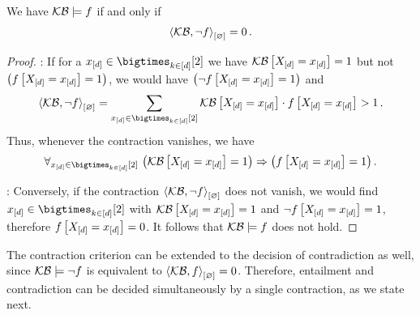 \begin{theorem}
    \label{the:contCriterionLogEntailment}
    We have $\mathcal{KB}\models f$ if and only if
    \begin{align*}
        \left\langle \mathcal{KB},\lnot f\right\rangle_{\left[ \varnothing \right]} = 0 \, .
    \end{align*}
\end{theorem}
\begin{proof}
    \proofleftsymbol:
    If for a $\shortatomindicesin$ we have $\mathcal{KB}\left[X_{[d]}=x_{[d]}\right]=1$ but not $\big(f\left[X_{[d]}=x_{[d]}\right]=1\big)$, we would have $\big(\lnot f\left[X_{[d]}=x_{[d]}\right]=1\big)$ and
    \begin{align*}
        \contraction{\kb,\lnot\exformula} =
        \sum_{\shortatomindicesin} \kbat{\indexedshortcatvariables} \cdot \exformulaat{\indexedshortcatvariables} > 1 \, .
    \end{align*}
    Thus, whenever the contraction vanishes, we have
    \begin{align*}
        \uniquantwrtof{\shortatomindicesin}{\imppremhead{\kbat{\indexedshortcatvariables}=1}{\formulaat{\indexedshortcatvariables}=1}} \, .
    \end{align*}

    \proofrightsymbol:
    Conversely, if the contraction $\left\langle \mathcal{KB},\lnot f\right\rangle_{\left[ \varnothing \right]}$ does not vanish, we would find $\shortatomindicesin$ with $\mathcal{KB}\left[X_{[d]}=x_{[d]}\right]=1$ and $\lnot f\left[X_{[d]}=x_{[d]}\right]=1$, therefore $f\left[X_{[d]}=x_{[d]}\right]=0$.
    It follows that $\mathcal{KB}\models f$ does not hold.
\end{proof}


The contraction criterion can be extended to the decision of contradiction as well, since $\mathcal{KB}\models\lnot f$ is equivalent to $\left\langle \mathcal{KB},f\right\rangle_{\left[ \varnothing \right]}=0$.
Therefore, entailment and contradiction can be decided simultaneously by a single contraction, as we state next.

